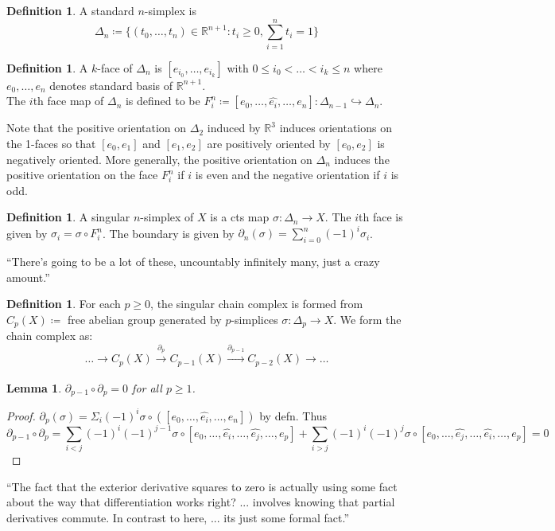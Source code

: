 \documentclass[10pt]{article}
\theoremstyle{plain}
\newtheorem{lemma}[thm]{Lemma}
\theoremstyle{definition}
\newtheorem{defn}[thm]{Definition} %
\newcommand{\Real}{\mathbb{R}}
\newcommand{\sumfromto}[2]{\sum\limits_{#1}^{#2}}
\begin{document}
\begin{defn}
    A standard $n$-simplex is 
    $$\Delta_n \coloneqq \{ (t_0,\ldots,t_n)\in \Real^{n+1} : t_i \geq 0, \sumfromto{i=1}{n} t_i = 1\}$$
\end{defn}
\begin{defn}
    A $k$-face of $\Delta_n$ is $[e_{i_0},\ldots,e_{i_k}]$ with $0\leq i_0 < \ldots < i_k  \leq n$ where $e_0,\ldots,e_n$ denotes standard basis of $\Real^{n+1}$.\\
    The $i$th face map of $\Delta_n$ is defined to be $F_i^n \coloneqq [e_0,\ldots,\hat{e_i},\ldots,e_n] : \Delta_{n-1} \hookrightarrow \Delta_n$.
\end{defn}
Note that the positive orientation on $\Delta_2$ induced by $\Real^3$ induces orientations on the 1-faces so that $[e_0,e_1]$ and $[e_1,e_2]$ are positively oriented by $[e_0,e_2]$ is negatively oriented. More generally, the positive orientation on $\Delta_n$ induces the positive orientation on the face $F_i^n$ if $i$ is even and the negative orientation if $i$ is odd.

\begin{defn}
    A singular $n$-simplex of $X$ is a cts map $\sigma:\Delta_n \to X$. The $i$th face is given by $\sigma_i = \sigma \circ F^n_i$. The boundary is given by $\partial_n (\sigma) = \sumfromto{i=0}{n} (-1)^i \sigma_i$.
\end{defn}
``There's going to be a lot of these, uncountably infinitely many, just a crazy amount.''
\begin{defn}
    For each $p\geq 0$, the singular chain complex is formed from $C_p(X) \coloneqq$ free abelian group generated by $p$-simplices $\sigma :\Delta_p \to X$. We form the chain complex as:
    $$\ldots \to C_p(X) \xrightarrow[]{\partial_p} C_{p-1}(X) \xrightarrow[]{\partial_{p-1}} C_{p-2}(X) \to \ldots$$
\end{defn}

\begin{lemma}
    $\partial_{p-1} \circ \partial_p = 0$ for all $p \geq 1$.
\end{lemma}

\begin{proof}
    $\partial_p(\sigma) = \Sigma_i (-1)^i \sigma \circ ([e_0,\ldots,\hat{e_i},\ldots,e_n])$ by defn. Thus
    $$
    \partial_{p-1}\circ \partial_p = \sumfromto{i<j}{} (-1)^i (-1)^{j-1} \sigma \circ [e_0,\ldots,\hat{e_i},\ldots,\hat{e_j},\ldots,e_p] + \sumfromto{i>j}{} (-1)^i (-1)^{j} \sigma \circ [e_0,\ldots,\hat{e_j},\ldots,\hat{e_i},\ldots,e_p] =0
    $$
\end{proof}
\noindent
``The fact that the exterior derivative squares to zero is actually using some fact about the way that differentiation works right? ... involves knowing that partial derivatives commute. In contrast to here, ... its just some formal fact.''
\end{document}
